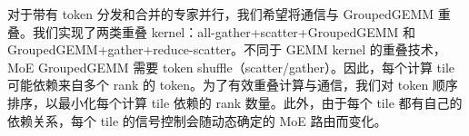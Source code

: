 

对于带有 token 分发和合并的专家并行，我们希望将通信与 GroupedGEMM 重叠。我们实现了两类重叠 kernel：all-gather+scatter+GroupedGEMM 和 GroupedGEMM+gather+reduce-scatter。不同于 GEMM kernel 的重叠技术，MoE GroupedGEMM 需要 token shuffle（scatter/gather）。因此，每个计算 tile 可能依赖来自多个 rank 的 token。为了有效重叠计算与通信，我们对 token 顺序排序，以最小化每个计算 tile 依赖的 rank 数量。此外，由于每个 tile 都有自己的依赖关系，每个 tile 的信号控制会随动态确定的 MoE 路由而变化。

